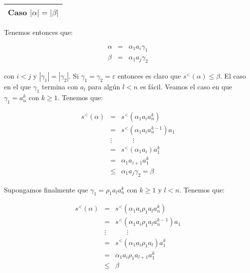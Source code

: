     \vspace{3mm}
    \begin{tabular}{|c|}
      \hline Caso $\left\vert \alpha \right\vert =\left\vert \beta \right\vert$\\\hline
    \end{tabular}

    \par Tenemos entonces que:

    \begin{eqnarray}
      \nonumber \alpha &=& \alpha_{1} a_{i} \gamma_{1} \\
      \nonumber \beta &=& \alpha_{1} a_{j} \gamma_{2}
    \end{eqnarray}

    con $i < j$ y $\left\vert \gamma_{1} \right\vert = \left\vert \gamma_{2}\right\vert$. Si $\gamma_{1} = \gamma_{2} =
    \varepsilon$ entonces es claro que $s^{<}(\alpha) \leq \beta$. El caso en el que $\gamma_{1}$ termina con $a_{l}$
    para algún $l < n$ es fácil. Veamos el caso en que $\gamma_{1} = a_{n}^{k}$ con $k \geq 1.$ Tenemos que:

    \begin{eqnarray}
      \nonumber s^{<}(\alpha ) & = & s^{<}(\alpha _{1}a_{i}a_{n}^{k}) \\
      \nonumber &=& s^{<}(\alpha_{1} a_{i} a_{n}^{k - 1}) a_{1} \\
      \nonumber &\vdots& \;\;\;\;\;\;\vdots \\
      \nonumber &=& s^{<}(\alpha_{1} a_{i}) a_{1}^{k} \\
      \nonumber &=& \alpha_{1} a_{i + 1} a_{1}^{k} \\
      \nonumber &\leq& \alpha_{1} a_{j} \gamma_{2} = \beta
    \end{eqnarray}

    \par Supongamos finalmente que $\gamma_{1} = \rho_{1} a_{l} a_{n}^{k}$ con $k \geq 1$ y $l < n$. Tenemos que:

    \begin{eqnarray}
      \nonumber s^{<}(\alpha) &=& s^{<}(\alpha_{1} a_{i} \rho_{1} a_{l} a_{n}^{k}) \\
      \nonumber &=& s^{<}(\alpha_{1} a_{i} \rho_{1} a_{l} a_{n}^{k - 1}) a_{1} \\
      \nonumber &\vdots& \;\;\;\;\;\;\vdots \\
      \nonumber &=& s^{<}(\alpha_{1} a_{i} \rho_{1} a_{l}) a_{1}^{k} \\
      \nonumber &=& \alpha_{1} a_{i} \rho_{1} a_{l + 1} a_{1}^{k} \\
      \nonumber &\leq& \beta
    \end{eqnarray}

